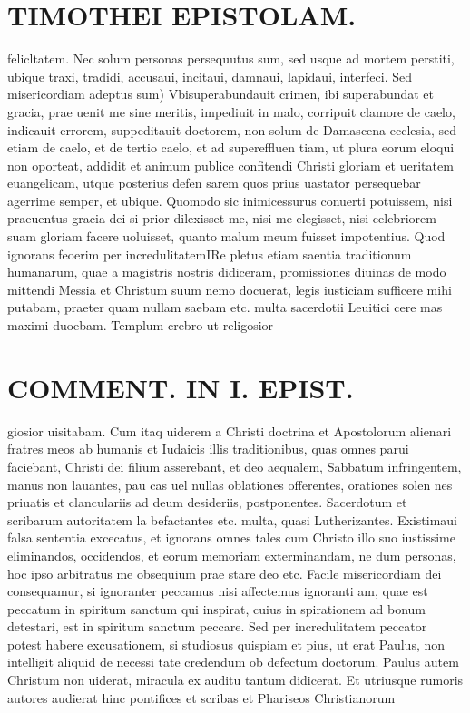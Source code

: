 \documentclass{article}
\begin{document}
\begin{pages}
\section*{TIMOTHEI EPISTOLAM. }
\marginpar{[ p.27 ]}\pstart felicltatem. Nec solum personas persequutus sum, sed usque ad mortem perstiti, ubique traxi, tradidi, accusaui, incitaui, damnaui, lapidaui, interfeci.  \pend\pstart Sed misericordiam adeptus sum) Vbisuperabundauit crimen, ibi superabundat et gracia, prae uenit me sine meritis, impediuit in malo, corripuit clamore de caelo, indicauit errorem, suppeditauit doctorem, non solum de Damascena ecclesia, sed etiam de caelo, et de tertio caelo, et ad supereffluen tiam, ut plura eorum eloqui non oporteat, addidit et animum publice confitendi Christi gloriam et ueritatem euangelicam, utque posterius defen sarem quos prius uastator persequebar agerrime semper, et ubique. Quomodo sic inimicessurus conuerti potuissem, nisi praeuentus gracia dei si prior dilexisset me, nisi me elegisset, nisi celebriorem suam gloriam facere uoluisset, quanto malum meum fuisset impotentius.  \pend\pstart Quod ignorans feoerim per incredulitatemIRe pletus etiam saentia traditionum humanarum, quae a magistris nostris didiceram, promissiones diuinas de modo mittendi Messia et Christum suum nemo docuerat, legis iusticiam sufficere mihi putabam, praeter quam nullam saebam etc. multa sacerdotii Leuitici cere mas maximi duoebam. Templum crebro ut religosior  \pend
\section*{COMMENT. IN I. EPIST. }
\marginpar{[ p.28 ]}\pstart giosior uisitabam. Cum itaq uiderem a Christi doctrina et Apostolorum alienari fratres meos ab humanis et Iudaicis illis traditionibus, quas omnes parui faciebant, Christi dei filium asserebant, et deo aequalem, Sabbatum infringentem, manus non lauantes, pau cas uel nullas oblationes offerentes, orationes solen nes priuatis et clanculariis ad deum desideriis, postponentes. Sacerdotum et scribarum autoritatem la befactantes etc. multa, quasi Lutherizantes. Existimaui falsa sententia excecatus, et ignorans omnes tales cum Christo illo suo iustissime eliminandos, occidendos, et eorum memoriam exterminandam, ne dum personas, hoc ipso arbitratus me obsequium prae stare deo etc.  \pend\pstart Facile misericordiam dei consequamur, si ignoranter peccamus nisi affectemus ignoranti am, quae est peccatum in spiritum sanctum qui inspirat, cuius in spirationem ad bonum detestari, est in spiritum sanctum peccare. Sed per incredulitatem peccator potest habere excusationem, si studiosus quispiam et pius, ut erat Paulus, non intelligit aliquid de necessi tate credendum ob defectum doctorum. Paulus autem Christum non uiderat, miracula ex auditu tantum didicerat. Et utriusque rumoris autores audierat hinc pontifices et scribas et Phariseos Christianorum  \pend

\end{pages}
\end{document}
